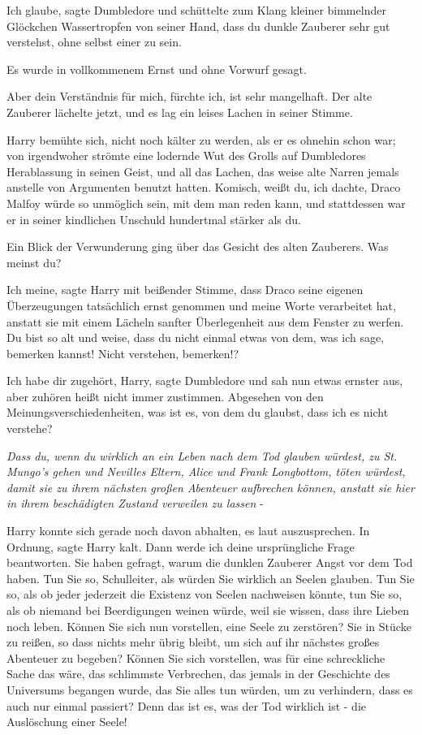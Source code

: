 \glqq Ich glaube\grqq{}, sagte Dumbledore und schüttelte zum Klang kleiner
bimmelnder Glöckchen Wassertropfen von seiner Hand, \glqq dass du dunkle
Zauberer sehr gut verstehst, ohne selbst einer zu sein.\grqq{}

Es wurde in vollkommenem Ernst und ohne Vorwurf gesagt.

\glqq Aber dein Verständnis für mich, fürchte ich, ist sehr mangelhaft.\grqq{}
Der alte Zauberer lächelte jetzt, und es lag ein leises Lachen in seiner Stimme.

Harry bemühte sich, nicht noch kälter zu werden, als er es ohnehin schon war;
von irgendwoher strömte eine lodernde Wut des Grolls auf Dumbledores
Herablassung in seinen Geist, und all das Lachen, das weise alte Narren jemals
anstelle von Argumenten benutzt hatten. \glqq Komisch, weißt du, ich dachte,
Draco Malfoy würde so unmöglich sein, mit dem man reden kann, und stattdessen
war er in seiner kindlichen Unschuld hundertmal stärker als du.\grqq{}

Ein Blick der Verwunderung ging über das Gesicht des alten Zauberers. \glqq Was
meinst du?\grqq{}

\glqq Ich meine\grqq{}, sagte Harry mit beißender Stimme, \glqq dass Draco seine
eigenen Überzeugungen tatsächlich ernst genommen und meine Worte verarbeitet
hat, anstatt sie mit einem Lächeln sanfter Überlegenheit aus dem Fenster zu
werfen. Du bist so alt und weise, dass du nicht einmal etwas von dem, was ich
sage, bemerken kannst! Nicht verstehen, bemerken!?\grqq{}

\glqq Ich habe dir zugehört, Harry\grqq{}, sagte Dumbledore und sah nun etwas
ernster aus, \glqq aber zuhören heißt nicht immer zustimmen. Abgesehen von den
Meinungsverschiedenheiten, was ist es, von dem du glaubst, dass ich es nicht
verstehe?\grqq{}

\emph{Dass du, wenn du wirklich an ein Leben nach dem Tod glauben würdest, zu
St. Mungo's gehen und Nevilles Eltern, Alice und Frank Longbottom, töten
würdest, damit sie zu ihrem nächsten großen Abenteuer aufbrechen können, anstatt
sie hier in ihrem beschädigten Zustand verweilen zu lassen} -

Harry konnte sich gerade noch davon abhalten, es laut auszusprechen. \glqq In
Ordnung\grqq{}, sagte Harry kalt. \glqq Dann werde ich deine ursprüngliche Frage
beantworten. Sie haben gefragt, warum die dunklen Zauberer Angst vor dem Tod
haben. Tun Sie so, Schulleiter, als würden Sie wirklich an Seelen glauben. Tun
Sie so, als ob jeder jederzeit die Existenz von Seelen nachweisen könnte, tun
Sie so, als ob niemand bei Beerdigungen weinen würde, weil sie wissen, dass ihre
Lieben noch leben. Können Sie sich nun vorstellen, eine Seele zu zerstören? Sie
in Stücke zu reißen, so dass nichts mehr übrig bleibt, um sich auf ihr nächstes
großes Abenteuer zu begeben? Können Sie sich vorstellen, was für eine
schreckliche Sache das wäre, das schlimmste Verbrechen, das jemals in der
Geschichte des Universums begangen wurde, das Sie alles tun würden, um zu
verhindern, dass es auch nur einmal passiert? Denn das ist es, was der Tod
wirklich ist - die Auslöschung einer Seele!\grqq{}

